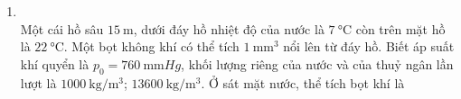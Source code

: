 \begin{enumerate}[label=\bfseries Câu \arabic*:, leftmargin=1.7cm]
\item {}\\
Một cái hồ sâu $\SI{15}{\meter}$, dưới đáy hồ nhiệt độ của nước là $\SI{7}{\celsius}$ còn trên mặt hồ là $\SI{22}{\celsius}$. Một bọt không khí có thể tích $\SI{1}{\milli\meter^3}$ nổi lên từ đáy hồ. Biết áp suất khí quyển là $p_0=\SI{760}{\milli\meter Hg}$, khối lượng riêng của nước và của thuỷ ngân lần lượt là $\SI{1000}{\kilogram/\meter^3}$; $\SI{13600}{\kilogram/\meter^3}$. Ở sát mặt nước, thể tích bọt khí là 


\end{enumerate}
